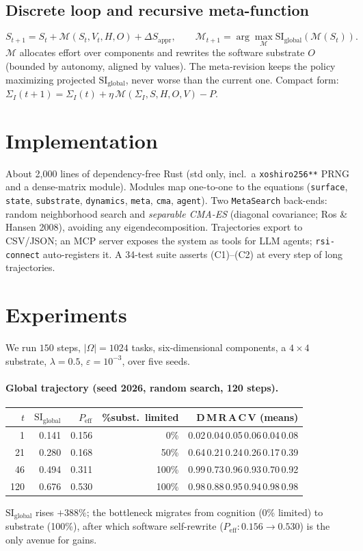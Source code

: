 \documentclass[11pt]{article}
\newcommand{\SI}{\mathrm{SI}_{\text{global}}}
\newcommand{\Peff}{P_{\text{eff}}}
\begin{document}
\subsection{Discrete loop and recursive meta-function}
\[
S_{t+1}=S_t+\mathcal{M}(S_t,V_t,H,O)+\Delta S_{\text{appr}},
\qquad
\mathcal{M}_{t+1}=\arg\max_{\mathcal{M}}\SI(\mathcal{M}(S_t)).
\]
$\mathcal{M}$ allocates effort over components and rewrites the software
substrate $O$ (bounded by autonomy, aligned by values). The meta-revision keeps
the policy maximizing projected $\SI$, never worse than the current one. Compact
form: $\Sigma_I(t{+}1)=\Sigma_I(t)+\eta\,\mathcal{M}(\Sigma_I,S,H,O,V)-P$.

\section{Implementation}
About 2{,}000 lines of dependency-free Rust (std only, incl.\ a
\texttt{xoshiro256**} PRNG and a dense-matrix module). Modules map one-to-one to
the equations (\texttt{surface}, \texttt{state}, \texttt{substrate},
\texttt{dynamics}, \texttt{meta}, \texttt{cma}, \texttt{agent}). Two
\texttt{MetaSearch} back-ends: random neighborhood search and \emph{separable
CMA-ES} (diagonal covariance; Ros \& Hansen 2008), avoiding any
eigendecomposition. Trajectories export to CSV/JSON; an MCP server exposes the
system as tools for LLM agents; \texttt{rsi-connect} auto-registers it. A
34-test suite asserts (C1)--(C2) at every step of long trajectories.

\section{Experiments}
We run $150$ steps, $|\Omega|=1024$ tasks, six-dimensional components, a
$4\times4$ substrate, $\lambda=0.5$, $\varepsilon=10^{-3}$, over five seeds.

\paragraph{Global trajectory (seed 2026, random search, 120 steps).}
\begin{center}
\begin{tabular}{rrrrr}
\toprule
$t$ & $\SI$ & $\Peff$ & \%subst.\ limited & D\,M\,R\,A\,C\,V (means)\\
\midrule
1   & 0.141 & 0.156 & 0\%   & 0.02\,0.04\,0.05\,0.06\,0.04\,0.08\\
21  & 0.280 & 0.168 & 50\%  & 0.64\,0.21\,0.24\,0.26\,0.17\,0.39\\
46  & 0.494 & 0.311 & 100\% & 0.99\,0.73\,0.96\,0.93\,0.70\,0.92\\
120 & 0.676 & 0.530 & 100\% & 0.98\,0.88\,0.95\,0.94\,0.98\,0.98\\
\bottomrule
\end{tabular}
\end{center}
$\SI$ rises $+388\%$; the bottleneck migrates from cognition (0\% limited) to
substrate (100\%), after which software self-rewrite ($\Peff:0.156\to0.530$) is
the only avenue for gains.
\end{document}
